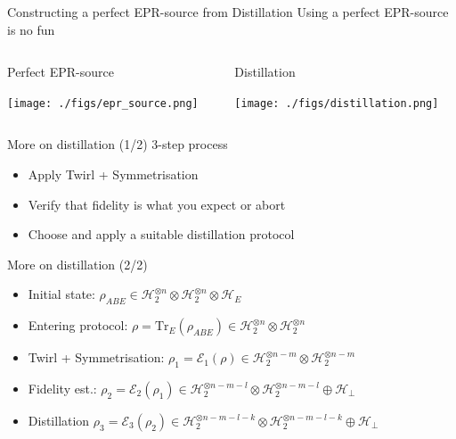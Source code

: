 \documentclass[presentation]{beamer}
\begin{document}
\begin{frame}[label={sec:orgeb323a0}]{Constructing a perfect EPR-source from Distillation}
\alert{\alert{Using a perfect EPR-source is no fun}}
\begin{columns}[t]
\begin{column}{.5\columnwidth}
\begin{block}{Perfect EPR-source}
\begin{center}
\texttt{[image: ./figs/epr\_source.png]}
\end{center}
\end{block}
\end{column}
\begin{column}{.5\columnwidth}
\begin{block}{Distillation}
\begin{center}
\texttt{[image: ./figs/distillation.png]}
\end{center}
\end{block}
\end{column}
\end{columns}
\end{frame}
\begin{frame}[label={sec:org01db217}]{More on distillation (1/2)}
3-step process
\begin{itemize}
\item Apply Twirl + Symmetrisation
\item Verify that fidelity is what you expect or abort
\item Choose and apply a suitable distillation protocol
\end{itemize}
\end{frame}

\begin{frame}[label={sec:org2c7d2ac}]{More on distillation (2/2)}
\begin{itemize}
\item Initial state: \(\rho_{ABE} \in \mathcal{H}_2^{\otimes n} \otimes \mathcal{H}_2^{\otimes n} \otimes \mathcal H_E\)
\item Entering protocol: \(\rho = \text{Tr}_{E}(\rho_{ABE}) \in \mathcal H_2^{\otimes n} \otimes \mathcal H_2^{\otimes n}\)
\item Twirl + Symmetrisation: \(\rho_1 = \mathcal E_1(\rho) \in \mathcal H_2^{\otimes n-m} \otimes \mathcal H_2^{\otimes n-m}\)
\item Fidelity est.: \(\rho_2 = \mathcal E_2(\rho_1) \in \mathcal H_2^{\otimes n-m-l} \otimes \mathcal H_2^{\otimes n-m-l} \oplus \mathcal H_\perp\)
\item Distillation \(\rho_3 = \mathcal E_3(\rho_2) \in \mathcal H_2^{\otimes n-m-l-k} \otimes \mathcal H_2^{\otimes n-m-l-k} \oplus \mathcal H_\perp\)
\end{itemize}
\end{frame}
\end{document}
